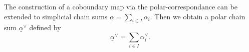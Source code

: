 \documentclass[12pt]{amsart}
\theoremstyle{definition}
\theoremstyle{remark}
\newcommand{\del}{\partial}
\begin{document}
The construction of a coboundary map via the polar-correspondance can be extended to simplicial chain sums $\underline{\alpha}=\sum_{i\in I} \alpha_i$. Then we obtain a polar chain sum $\underline{\alpha}^\vee$ defined by $$\underline{\alpha}^\vee= \sum_{i\in I} \alpha_i^\vee.$$ 



\end{document}
